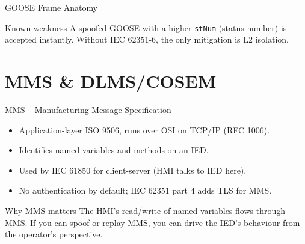 \documentclass[aspectratio=169,11pt]{beamer}
\begin{document}
\begin{frame}{GOOSE Frame Anatomy}
\centering
{}
\vspace{2mm}
\begin{notebox}{Known weakness}
A spoofed GOOSE with a higher \texttt{stNum} (status number) is accepted instantly. Without IEC 62351-6, the only mitigation is L2 isolation.
\end{notebox}
\end{frame}

\section{MMS \& DLMS/COSEM}

\begin{frame}{MMS -- Manufacturing Message Specification}
\begin{itemize}
  \item Application-layer ISO 9506, runs over OSI on TCP/IP (RFC 1006).
  \item Identifies named variables and methods on an IED.
  \item Used by IEC 61850 for client-server (HMI talks to IED here).
  \item No authentication by default; IEC 62351 part 4 adds TLS for MMS.
\end{itemize}
\begin{notebox}{Why MMS matters}
The HMI's read/write of named variables flows through MMS. If you can spoof or replay MMS, you can drive the IED's behaviour from the operator's perspective.
\end{notebox}
\end{frame}
\end{document}
